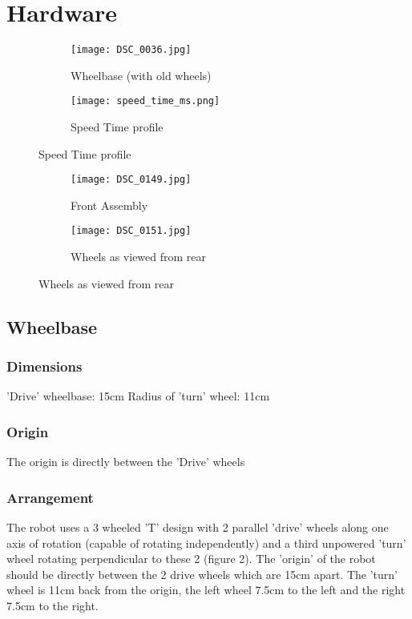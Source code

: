 \section{Hardware}

\begin{figure}[H]
\begin{subfigure}{.45\textwidth}
\centering
\texttt{[image: DSC\_0036.jpg]}
\caption{Wheelbase (with old wheels)}
\label{pic:wheelbase}
\end{subfigure}
\begin{subfigure}{.45\textwidth}
\centering
\texttt{[image: speed\_time\_ms.png]}
\caption{Speed Time profile}
\label{pic:front}
\end{subfigure}
\label{pic:construction}
\end{figure}

\begin{figure}[H]
\begin{subfigure}{.45\textwidth}
\centering
\texttt{[image: DSC\_0149.jpg]}
\caption{Front Assembly}
\label{pic:wheelbase}
\end{subfigure}
\begin{subfigure}{.45\textwidth}
\centering
\texttt{[image: DSC\_0151.jpg]}
\caption{Wheels as viewed from rear}
\label{pic:front}
\end{subfigure}

\label{pic:construction}
\end{figure}

\subsection{Wheelbase}
\subsubsection{Dimensions}
'Drive' wheelbase:		15cm \newline
Radius of 'turn' wheel: 11cm
\subsubsection{Origin}
The origin is directly between the 'Drive' wheels
\subsubsection{Arrangement}
The robot uses a 3 wheeled 'T' design with 2 parallel 'drive' wheels along one axis of rotation (capable of rotating independently) and a third unpowered 'turn' wheel rotating perpendicular to these 2 (figure 2). The 'origin' of the robot should be 
directly between the 2 drive wheels which are 15cm apart. The 'turn' wheel 
is 11cm back from the origin, the left wheel 7.5cm to the left and the right
7.5cm to the right. 

